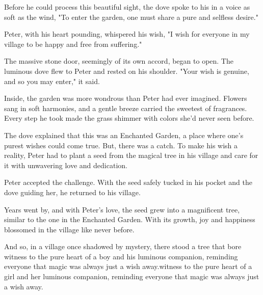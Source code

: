 \documentclass[10pt, a4paper, titlepage]{article}
\begin{document}
Before he could process this beautiful sight, the dove spoke to his in a voice as soft as the wind, "To enter the garden, one must share a pure and selfless desire."

Peter, with his heart pounding, whispered his wish, "I wish for everyone in my village to be happy and free from suffering."

The massive stone door, seemingly of its own accord, began to open. The luminous dove flew to Peter and rested on his shoulder. "Your wish is genuine, and so you may enter," it said.

Inside, the garden was more wondrous than Peter had ever imagined. Flowers sang in soft harmonies, and a gentle breeze carried the sweetest of fragrances. Every step he took made the grass shimmer with colors she'd never seen before.

The dove explained that this was an Enchanted Garden, a place where one’s purest wishes could come true. But, there was a catch. To make his wish a reality, Peter had to plant a seed from the magical tree in his village and care for it with unwavering love and dedication.

Peter accepted the challenge. With the seed safely tucked in his pocket and the dove guiding her, he returned to his village.

Years went by, and with Peter's love, the seed grew into a magnificent tree, similar to the one in the Enchanted Garden. With its growth, joy and happiness blossomed in the village like never before.

And so, in a village once shadowed by mystery, there stood a tree that bore witness to the pure heart of a boy and his luminous companion, reminding everyone that magic was always just a wish away.witness to the pure heart of a girl and her luminous companion, reminding everyone that magic was always just a wish away.
\end{document}
